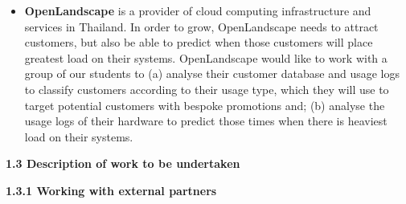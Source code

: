 \documentclass[11pt]{article}
\begin{document}
\begin{itemize}[leftmargin=6mm,itemsep=-3pt,topsep=1pt]
    \item {\bf OpenLandscape} is a provider of cloud computing infrastructure and services in Thailand. In order to grow, OpenLandscape needs to attract customers, but also be able to predict when those customers will place greatest load on their systems. OpenLandscape would like to work with a group of our students to (a) analyse their customer database and usage logs to classify customers according to their usage type, which they will use to target potential customers with bespoke promotions and; (b) analyse the usage logs of their hardware to predict those times when there is heaviest load on their systems.
  \end{itemize}
  \noindent
  {\large \bf 1.3 Description of work to be undertaken}
  
  \noindent
  {\bf 1.3.1 Working with external partners}
  
\end{document}
